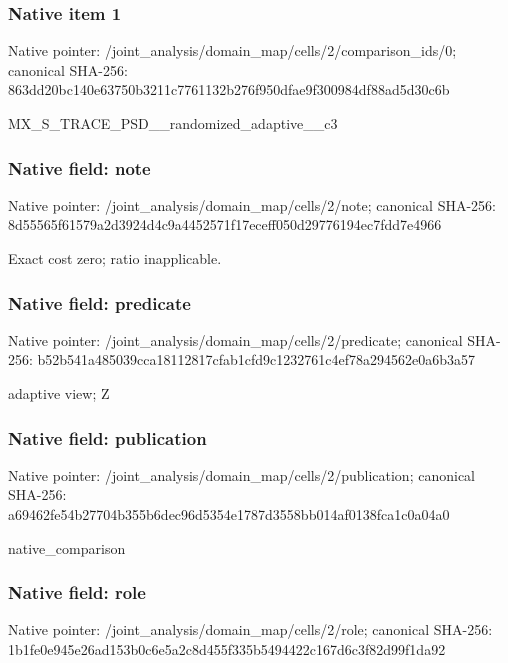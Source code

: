 \documentclass[10pt,a4paper]{article}
\begin{document}
\subsubsection{Native item 1}
Native pointer: /joint\_\allowbreak{}analysis/domain\_\allowbreak{}map/cells/2/comparison\_\allowbreak{}ids/0; canonical SHA-256: 863dd20bc140e63750b3211c7761132b276f950dfae9f300984df88ad5d30c6b

\begingroup\raggedright\sloppy MX\_\allowbreak{}S\_\allowbreak{}TRACE\_\allowbreak{}PSD\_\allowbreak{}\_\allowbreak{}randomized\_\allowbreak{}adaptive\_\allowbreak{}\_\allowbreak{}c3\par\endgroup

\subsubsection{Native field: note}
Native pointer: /joint\_\allowbreak{}analysis/domain\_\allowbreak{}map/cells/2/note; canonical SHA-256: 8d55565f61579a2d3924d4c9a4452571f17eceff050d29776194ec7fdd7e4966

\begingroup\raggedright\sloppy Exact cost zero;\allowbreak{} ratio inapplicable.\par\endgroup

\subsubsection{Native field: predicate}
Native pointer: /joint\_\allowbreak{}analysis/domain\_\allowbreak{}map/cells/2/predicate; canonical SHA-256: b52b541a485039cca18112817cfab1cfd9c1232761c4ef78a294562e0a6b3a57

\begingroup\raggedright\sloppy adaptive view;\allowbreak{} Z\par\endgroup

\subsubsection{Native field: publication}
Native pointer: /joint\_\allowbreak{}analysis/domain\_\allowbreak{}map/cells/2/publication; canonical SHA-256: a69462fe54b27704b355b6dec96d5354e1787d3558bb014af0138fca1c0a04a0

\begingroup\raggedright\sloppy native\_\allowbreak{}comparison\par\endgroup

\subsubsection{Native field: role}
Native pointer: /joint\_\allowbreak{}analysis/domain\_\allowbreak{}map/cells/2/role; canonical SHA-256: 1b1fe0e945e26ad153b0c6e5a2c8d455f335b5494422c167d6c3f82d99f1da92
\end{document}
